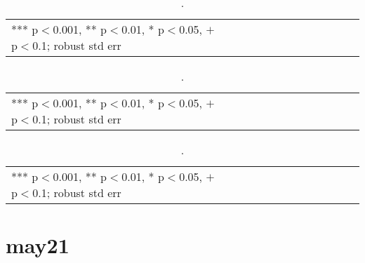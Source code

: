 \documentclass[10pt, letterpaper]{article}
\begin{document}
\begin{spacing}{1.4}
\begin{spacing}{.9}
  \begin{table}[H]\centering \caption{.} \label{fA} \begin{scriptsize} \begin{tabular}{p{1.8in}p{.5in}p{.5in}p{.5in}p{.5in}p{.5in}p{.5in}p{.5in}p{.5in}p{.5in}p{.5
            in}p{.5in}p{.5 in}}\hline
        
\hline  *** p$<$0.001, ** p$<$0.01, * p$<$0.05, $+$ p$<$0.1; robust std err
         \end{tabular}\end{scriptsize}\end{table}
\end{spacing}

\begin{spacing}{.9}
  \begin{table}[H]\centering \caption{.} \label{fA} \begin{scriptsize} \begin{tabular}{p{1.8in}p{.5in}p{.5in}p{.5in}p{.5in}p{.5in}p{.5in}p{.5in}p{.5in}p{.5in}p{.5
            in}p{.5in}p{.5 in}}\hline
        
\hline  *** p$<$0.001, ** p$<$0.01, * p$<$0.05, $+$ p$<$0.1; robust std err
         \end{tabular}\end{scriptsize}\end{table}
\end{spacing}

\begin{spacing}{.9}
  \begin{table}[H]\centering \caption{.} \label{fA} \begin{scriptsize} \begin{tabular}{p{1.8in}p{.5in}p{.5in}p{.5in}p{.5in}p{.5in}p{.5in}p{.5in}p{.5in}p{.5in}p{.5
            in}p{.5in}p{.5 in}}\hline
        
\hline  *** p$<$0.001, ** p$<$0.01, * p$<$0.05, $+$ p$<$0.1; robust std err
         \end{tabular}\end{scriptsize}\end{table}
\end{spacing}


\section{may21}


\end{spacing}
\end{document}
